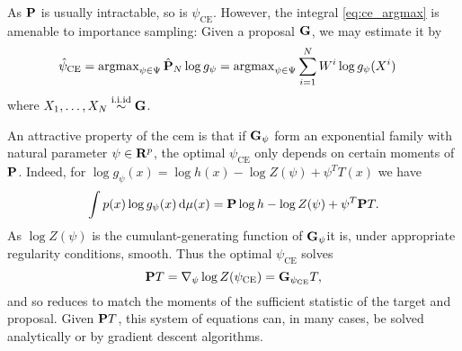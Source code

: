 As $\P$ is usually intractable, so is $\psi_{\text{CE}}$. However, the integral \cref{eq:ce_argmax} is amenable to importance sampling: Given a proposal $\G$, we may estimate it by
\begin{align}
\hat\psi_{\text{CE}} &= \argmax_{\psi \in \Psi} \hat \P_{N} \log g_{\psi} = \argmax_{\psi\in\Psi} \sum_{i = 1}^{N}W^{i}\log g_{\psi}(X^{i}) \label{eq:ce-M-estimator}
\end{align}
where $X_1, \dots, X_N \iid \G$. 
%
%
%
%
%    

An attractive property of the \gls{cem} is that if $\G_{\psi}$ form an exponential family with natural parameter $\psi \in \R^{p}$, the optimal $\psi_{\text{CE}}$ only depends on certain moments of $\P$. Indeed, for $\log g_{\psi}(x) = \log h(x) - \log Z(\psi) + \psi^{T} T(x)$ we have 
$$
\int p(x) \log g_{\psi}(x) \d \mu(x) = \P \log h - \log Z(\psi) + \psi^{T} \P T.
$$
 As $\log Z(\psi)$ is the cumulant-generating function of $\G_{\psi}$it is, under appropriate regularity conditions, smooth. Thus the optimal $\psi_{\text{CE}}$ solves
$$
\P T = \nabla_{\psi} \log Z(\pce) = \G_{\pce}T,
$$
and so reduces to match the moments of the sufficient statistic of the target and proposal.
Given $\P T$, this system of equations can, in many cases, be solved analytically or by gradient descent algorithms.


